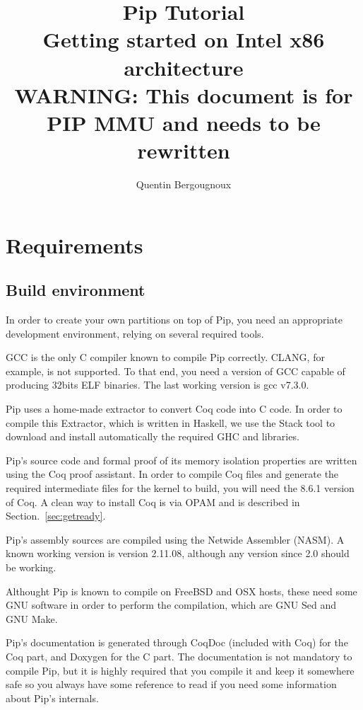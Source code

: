 \documentclass[10pt,a4paper,titlepage]{refart}
\author{Quentin Bergougnoux}
\title{Pip Tutorial \\ Getting started on Intel x86 architecture \\ \textbf{WARNING}: This document is for PIP MMU and needs to be rewritten}
\begin{document}
\maketitle
\tableofcontents
{}
\lstlistoflistings
\pagebreak
\section{Requirements}
\subsection{Build environment}
In order to create your own partitions on top of Pip, you need an appropriate development environment, relying on several required tools.

GCC is the only C compiler known to compile Pip correctly. CLANG, for example, is not supported. To that end, you need a version of GCC capable of producing 32bits ELF binaries. The last working version is gcc v7.3.0.

Pip uses a home-made extractor to convert Coq code into C code. In order to compile this Extractor, which is written in Haskell, we use the Stack tool to download and install automatically the required GHC and libraries.

Pip's source code and formal proof of its memory isolation properties are written
using the Coq proof assistant. In order to compile Coq files and
generate the required intermediate files for the kernel to build, you will need the 8.6.1 version of Coq.  A clean way to install Coq is via OPAM and is described in Section.~\ref{sec:getready}.

Pip's assembly sources are compiled using the Netwide Assembler (NASM). A known working version is version 2.11.08, although any version since 2.0 should be working.

Althought Pip is known to compile on FreeBSD and OSX hosts, these need some GNU software in order to perform the compilation, which are GNU Sed and GNU Make. 

Pip's documentation is generated through CoqDoc (included with Coq) for the Coq part, and Doxygen for the C part. The documentation is not mandatory to compile Pip, but it is highly required that you compile it and keep it somewhere safe so you always have some reference to read if you need some information about Pip's internals.
\end{document}

